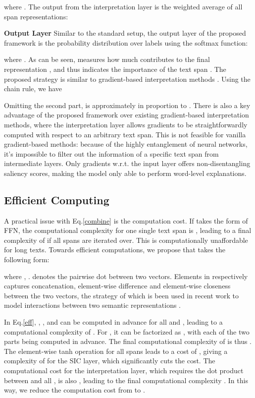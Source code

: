 \documentclass[11pt,a4paper]{article}
\begin{document}
where . The output  from the  interpretation layer is the weighted average of all span representations:

{\bf Output Layer} Similar to the standard setup, the output layer of the proposed framework is the probability distribution over labels using the softmax function:

where . 
As can be seen,  measures how much  contributes to the final representation , and thus indicates 
 the importance of the text span . The proposed strategy is similar to gradient-based interpretation methods \cite{simonyan2013deep,li2015visualizing}. Using the chain rule, we have 
 
Omitting the second part,   is approximately in proportion to 
.
There is also a key advantage of the proposed framework over existing gradient-based interpretation methods, where 
the interpretation layer allows 
gradients to be straightforwardly computed with respect to an arbitrary text span. This is not feasible for vanilla gradient-based methods: 
because of the highly entanglement of neural networks, it's impossible to filter out the information of a specific text span 
from intermediate layers. Only gradients w.r.t. the input layer offers non-disentangling saliency scores, making the model only able to perform word-level explanations. 
\subsection{Efficient Computing}
\label{F}
A practical issue with Eq.\ref{combine} is the computation cost. If  takes the form of FFN, the computational complexity for one single text span is , 
leading to a final complexity of  if all spans are iterated over. This  is   computationally unaffordable for long texts. 
Towards efficient computations, we propose that  takes the following form:

where , .  denotes the pairwise dot between two vectors. Elements in 
 respectively captures concatenation, element-wise difference and element-wise closeness between the two vectors, the strategy of which is been used in recent work to model interactions between two semantic representations \cite{mou2015natural,seo2016bidirectional}.

In Eq.\ref{eff}, , ,  and  can be computed in advance for all  and , leading to a computational complexity of . 
For , it can be factorized as , with each of the two parts being computed in advance. 
 The final computational complexity of  is thus . The element-wise tanh operation for all  spans leads to a cost of , giving a complexity of  for  the SIC layer, which significantly cuts the cost.
 The computational cost for the interpretation layer, which requires the dot product between  and all , is also ,
 leading to the final  computational complexity . 
In this way, we reduce the computation cost from  to . 
\end{document}
